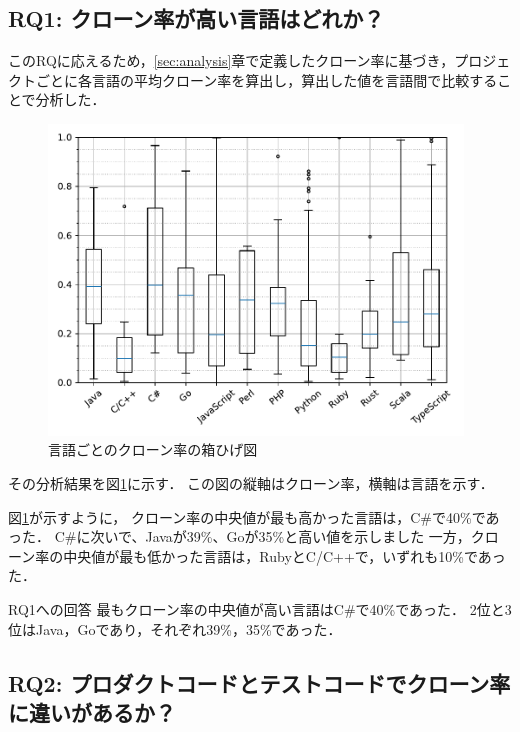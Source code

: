 \documentclass[T,J]{fose}
\begin{document}
\subsection{RQ1: クローン率が高い言語はどれか？}
このRQに応えるため，\ref{sec:analysis}章で定義したクローン率に基づき，プロジェクトごとに各言語の平均クローン率を算出し，算出した値を言語間で比較することで分析した．
\begin{figure}[tb]
    \centering
    \includegraphics[width=11.0cm]{images/RQ1.pdf}
    \caption{言語ごとのクローン率の箱ひげ図}
    \label{fig:cloneRateByLanguages}
\end{figure}
%
その分析結果を図\ref{fig:cloneRateByLanguages}に示す．
この図の縦軸はクローン率，横軸は言語を示す．

図\ref{fig:cloneRateByLanguages}が示すように，
クローン率の中央値が最も高かった言語は，C\#で40\%であった．
C\#に次いで、Javaが39\%、Goが35\%と高い値を示しました
一方，クローン率の中央値が最も低かった言語は，RubyとC/C++で，いずれも10\%であった．

\begin{itembox}[l]{RQ1への回答}
最もクローン率の中央値が高い言語はC\#で40\%であった．
2位と3位はJava，Goであり，それぞれ39\%，35\%であった．
\end{itembox}

\subsection{RQ2: プロダクトコードとテストコードでクローン率に違いがあるか？}
\end{document}
